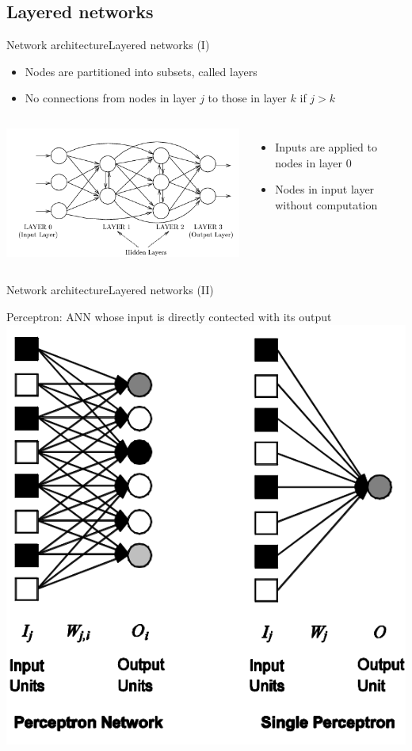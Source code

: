 \documentclass[10pt,compress]{beamer} %
\begin{document}
\subsection{Layered networks}
\begin{frame}{Network architecture}{Layered networks (I)}
		\begin{itemize}
		\item Nodes are partitioned into subsets, called layers
		\item No connections from nodes in layer $j$ to those in layer $k$ if $j > k$
		\end{itemize}

    \begin{columns}
	\centering\includegraphics[width=\linewidth]{figs/layered.png}
	   \begin{itemize}
	   \item Inputs are applied to nodes in layer 0
	   \item Nodes in input layer without computation
	   \end{itemize}
	   \end{columns}
\end{frame}

\begin{frame}{Network architecture}{Layered networks (II)}
	\begin{center}
	\alert{Perceptron}: ANN whose input is directly contected with its output
	\includegraphics[width=0.5\linewidth]{figs/network.png}
	\end{center}
\end{frame}
\end{document}
